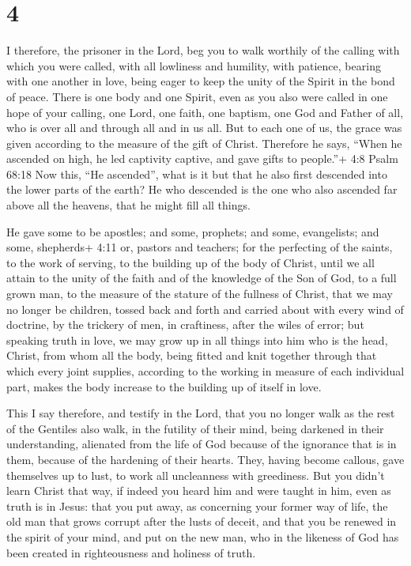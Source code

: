 \hypertarget{section-3}{%
\section{4}\label{section-3}}

 I therefore, the prisoner in the Lord, beg you to walk
worthily of the calling with which you were called,  with
all lowliness and humility, with patience, bearing with one another in
love,  being eager to keep the unity of the Spirit in the
bond of peace.  There is one body and one Spirit, even as
you also were called in one hope of your calling,  one Lord,
one faith, one baptism,  one God and Father of all, who is
over all and through all and in us all.  But to each one of
us, the grace was given according to the measure of the gift of Christ.
 Therefore he says, ``When he ascended on high, he led
captivity captive, and gave gifts to people.''+ 4:8 Psalm 68:18
 Now this, ``He ascended'', what is it but that he also
first descended into the lower parts of the earth?  He who
descended is the one who also ascended far above all the heavens, that
he might fill all things.

 He gave some to be apostles; and some, prophets; and some,
evangelists; and some, shepherds+ 4:11 or, pastors and teachers;
 for the perfecting of the saints, to the work of serving,
to the building up of the body of Christ,  until we all
attain to the unity of the faith and of the knowledge of the Son of God,
to a full grown man, to the measure of the stature of the fullness of
Christ,  that we may no longer be children, tossed back and
forth and carried about with every wind of doctrine, by the trickery of
men, in craftiness, after the wiles of error;  but speaking
truth in love, we may grow up in all things into him who is the head,
Christ,  from whom all the body, being fitted and knit
together through that which every joint supplies, according to the
working in measure of each individual part, makes the body increase to
the building up of itself in love.

 This I say therefore, and testify in the Lord, that you no
longer walk as the rest of the Gentiles also walk, in the futility of
their mind,  being darkened in their understanding,
alienated from the life of God because of the ignorance that is in them,
because of the hardening of their hearts.  They, having
become callous, gave themselves up to lust, to work all uncleanness with
greediness.  But you didn't learn Christ that way,
 if indeed you heard him and were taught in him, even as
truth is in Jesus:  that you put away, as concerning your
former way of life, the old man that grows corrupt after the lusts of
deceit,  and that you be renewed in the spirit of your
mind,  and put on the new man, who in the likeness of God
has been created in righteousness and holiness of truth.

